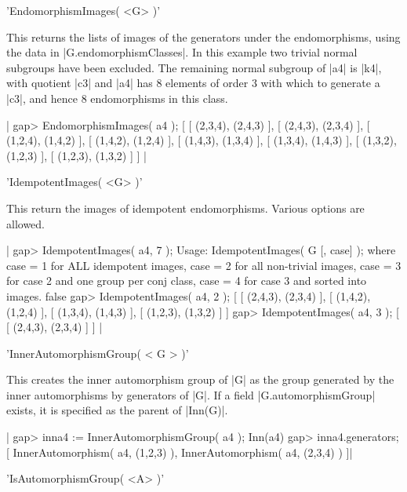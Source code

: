 'EndomorphismImages( <G> )'

This returns   the   lists of  images   of the  generators  under  the
endomorphisms, using the  data  in |G.endomorphismClasses|.    In this
example two trivial   normal   subgroups  have been   excluded.    The
remaining normal subgroup of |a4| is |k4|, with quotient |c3| and |a4|
has 8 elements of  order 3 with which to  generate a |c3|, and hence 8
endomorphisms in this class.

|    gap> EndomorphismImages( a4 );
    [ [ (2,3,4), (2,4,3) ], [ (2,4,3), (2,3,4) ], [ (1,2,4), (1,4,2) ], 
      [ (1,4,2), (1,2,4) ], [ (1,4,3), (1,3,4) ], [ (1,3,4), (1,4,3) ], 
      [ (1,3,2), (1,2,3) ], [ (1,2,3), (1,3,2) ] ]  |

%

'IdempotentImages( <G> )'

This return the  images of idempotent endomorphisms.   Various options
are allowed.

|    gap> IdempotentImages( a4, 7 );
    Usage: IdempotentImages( G [, case] );
    where  case = 1  for ALL idempotent images,
           case = 2  for all non-trivial images,
           case = 3  for case 2 and one group per conj class,
           case = 4  for case 3 and sorted into images.
    false
    gap> IdempotentImages( a4, 2 );
    [ [ (2,4,3), (2,3,4) ], [ (1,4,2), (1,2,4) ], [ (1,3,4), (1,4,3) ], 
      [ (1,2,3), (1,3,2) ] ]
    gap> IdempotentImages( a4, 3 );
    [ [ (2,4,3), (2,3,4) ] ]           |

%

'InnerAutomorphismGroup( < G > )'

This creates  the inner automorphism    group of  |G|  as the    group
generated by the inner automorphisms by generators of |G|.  If a field
|G.automorphismGroup|  exists, it  is   specified  as the  parent   of
|Inn(G)|.

|    gap> inna4 := InnerAutomorphismGroup( a4 );
    Inn(a4)
    gap> inna4.generators;
    [ InnerAutomorphism( a4, (1,2,3) ), InnerAutomorphism( a4, (2,3,4) ) ]|

%

'IsAutomorphismGroup( <A> )'

